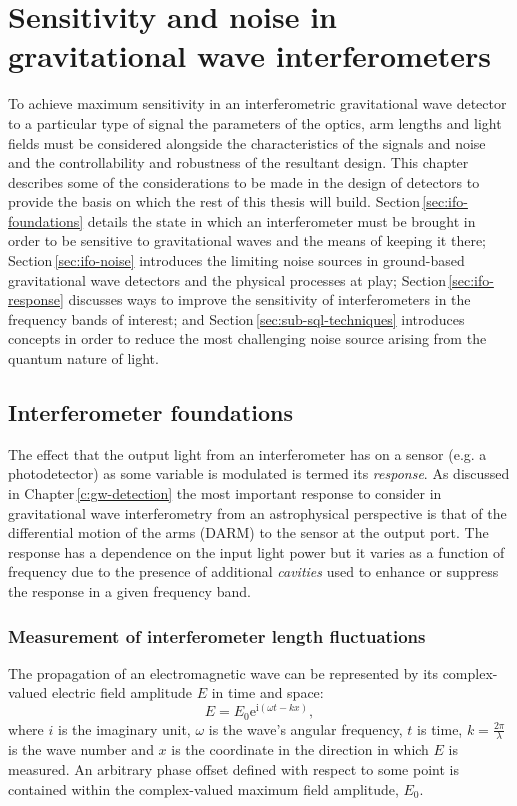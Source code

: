 \chapter{Sensitivity and noise in gravitational wave interferometers}
\label{c:instrumentation}

To achieve maximum sensitivity in an interferometric gravitational wave detector to a particular type of signal the parameters of the optics, arm lengths and light fields must be considered alongside the characteristics of the signals and noise and the controllability and robustness of the resultant design. This chapter describes some of the considerations to be made in the design of detectors to provide the basis on which the rest of this thesis will build. Section\,\ref{sec:ifo-foundations} details the state in which an interferometer must be brought in order to be sensitive to gravitational waves and the means of keeping it there; Section\,\ref{sec:ifo-noise} introduces the limiting noise sources in ground-based gravitational wave detectors and the physical processes at play; Section\,\ref{sec:ifo-response} discusses ways to improve the sensitivity of interferometers in the frequency bands of interest; and Section\,\ref{sec:sub-sql-techniques} introduces concepts in order to reduce the most challenging noise source arising from the quantum nature of light.

\section{\label{sec:ifo-foundations}Interferometer foundations}
The effect that the output light from an interferometer has on a sensor (e.g. a photodetector) as some variable is modulated is termed its \emph{response}. As discussed in Chapter\,\ref{c:gw-detection} the most important response to consider in gravitational wave interferometry from an astrophysical perspective is that of the differential motion of the arms (\gls{DARM}) to the sensor at the output port. The response has a dependence on the input light power but it varies as a function of frequency due to the presence of additional \emph{cavities} used to enhance or suppress the response in a given frequency band.

\subsection{Measurement of interferometer length fluctuations}
The propagation of an electromagnetic wave can be represented by its complex-valued electric field amplitude $E$ in time and space:
\begin{equation}
  \label{eq:em-propagation}
  E = E_0 \text{e}^{\text{i} \left( \omega t - kx \right)},
\end{equation}
where $i$ is the imaginary unit, $\omega$ is the wave's angular frequency, $t$ is time, $k = \frac{2 \pi}{\lambda}$ is the wave number and $x$ is the coordinate in the direction in which $E$ is measured. An arbitrary phase offset defined with respect to some point is contained within the complex-valued maximum field amplitude, $E_0$.

